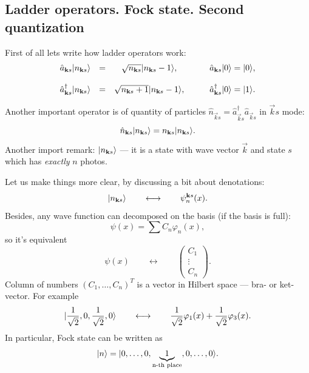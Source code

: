 	
	\subsection{Ladder operators. Fock state. Second quantization}
	
	First of all lets write how ladder operators work:
	\begin{equation}
		\begin{matrix}
			\hat{a}_{\mathbf{k}s} \lvert n_{\mathbf{k}s}\rangle &=& \sqrt{n_{\mathbf{k}s}} \lvert n_{\mathbf{k}s}-1\rangle, & \quad & \hat{a}_{\mathbf{k}s} \lvert0\rangle = \lvert0\rangle, \\ \\
			\hat{a}^{\dagger}_{\mathbf{k}s} \lvert n_{\mathbf{k}s}\rangle &=& \sqrt{n_{\mathbf{k}s}+1} \lvert n_{\mathbf{k}s}-1\rangle, & \quad & \hat{a}^{\dagger}_{\mathbf{k}s} \lvert0\rangle = \lvert1\rangle.
		\end{matrix}
	\end{equation}
	
	Another important operator is of quantity of particles $\hat{n}_{\vec{k}s} = \hat{a}^{\dagger}_{\vec{k}s} \hat{a}_{\vec{k}s}$ in $\vec{k}s$ mode:
	\begin{equation}
		\hat{n}_{\mathbf{k}s} \lvert n_{\mathbf{k}s}\rangle = n_{\mathbf{k}s} \lvert n_{\mathbf{k}s}\rangle.
	\end{equation}
	Another import remark: $\lvert n_{\mathbf{k}s}\rangle$ --- it is a state with wave vector $\vec{k}$ and state $s$ which has \textit{exactly} $n$ photos.
	
	
	Let us make things more clear, by discussing a bit about denotations:
	\begin{equation}
		\lvert n_{\mathbf{k}s}\rangle \qquad \longleftrightarrow \qquad \psi_n^{\mathbf{k}s} (x).
	\end{equation}
	Besides, any wave function can decomposed
	on the basis (if the basis is full):
	\begin{equation}
		\psi(x) = \sum C_n \varphi_n(x),
	\end{equation}
	so it's equivalent
	\begin{equation}
		\psi(x) \qquad \longleftrightarrow \qquad \left( \begin{matrix}
			C_1 \\
			\vdots \\
			C_n
		\end{matrix} \right).
	\end{equation}
	Column of numbers $\left(C_1, \dots , C_n\right)^T$ is a vector in Hilbert space --- bra- or ket-vector. For example
	\begin{equation}
		\lvert\frac{1}{\sqrt{2}},0,\frac{1}{\sqrt{2}},0\rangle \qquad \longleftrightarrow \qquad \frac{1}{\sqrt{2}} \varphi_1(x) + \frac{1}{\sqrt{2}} \varphi_3(x).
	\end{equation}
	In particular, Fock state can be written as
	\begin{equation}
		\lvert n\rangle = \lvert0, \dots, 0, \underbrace{1}_{\text{n-th place}}, 0, \dots , 0\rangle.
	\end{equation}
	
